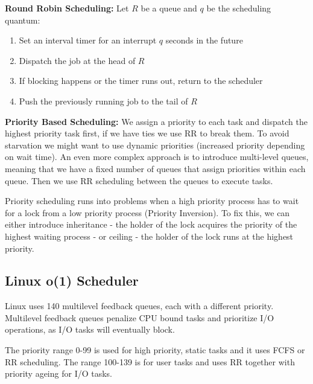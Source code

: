 \textbf{Round Robin Scheduling:} Let $R$ be a queue and $q$ be the scheduling quantum:
\begin{enumerate}
	\item Set an interval timer for an interrupt $q$ seconds in the future
	\item Dispatch the job at the head of $R$
	\item If blocking happens or the timer runs out, return to the scheduler
	\item Push the previously running job to the tail of $R$
\end{enumerate}

\textbf{Priority Based Scheduling:} We assign a priority to each task and dispatch the highest priority task first, if we have ties we use RR to break them. To avoid starvation we might want to use dynamic priorities (increased priority depending on wait time). An even more complex approach is to introduce multi-level queues, meaning that we have a fixed number of queues that assign priorities within each queue. Then we use RR scheduling between the queues to execute tasks. \medskip

Priority scheduling runs into problems when a high priority process has to wait for a lock from a low priority process (Priority Inversion). To fix this, we can either introduce inheritance - the holder of the lock acquires the priority of the highest waiting process - or ceiling - the holder of the lock runs at the highest priority.

\subsection{Linux o(1) Scheduler}

Linux uses 140 multilevel feedback queues, each with a different priority. Multilevel feedback queues penalize CPU bound tasks and prioritize I/O operations, as I/O tasks will eventually block.

The priority range 0-99 is used for high priority, static tasks and it uses FCFS or RR scheduling. The range 100-139 is for user tasks and uses RR together with priority ageing for I/O tasks.

